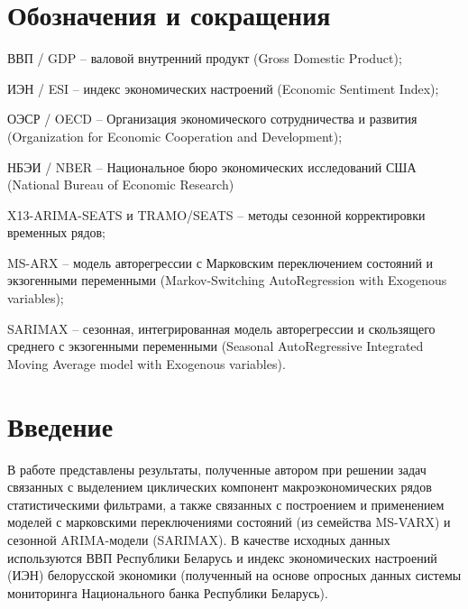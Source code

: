 \documentclass[a4paper,14pt]{extreport}
\begin{document}
	\clearpage
	
	\renewcommand{\contentsname}{Содержание}
	\tableofcontents
	
	\clearpage
	
	
	
	{
		\chapter*{Обозначения и сокращения}
		\nopagebreak %
		
	}

	{ВВП / GDP} -- валовой внутренний продукт (Gross Domestic Product);
	
	{ИЭН / ESI} -- индекс экономических настроений (Economic Sentiment Index);
	
	{ОЭСР / OECD} -- Организация экономического сотрудничества и развития (Organization for Economic Cooperation and Development);
	
	{НБЭИ / NBER} -- Национальное бюро экономических исследований США (National Bureau of Economic Research)
	
	{X13-ARIMA-SEATS} и {TRAMO/SEATS} -- методы сезонной корректировки временных рядов;
	
	{MS-ARX} -- модель авторегрессии с Марковским переключением состояний и экзогенными переменными (Markov-Switching AutoRegression with Exogenous variables);
	
	{SARIMAX} -- сезонная, интегрированная модель авторегрессии и скользящего среднего с экзогенными переменными (Seasonal AutoRegressive Integrated Moving Average model with Exogenous variables).
	
	\clearpage
	
	
	\chapter*{Введение}
	В работе представлены результаты, полученные автором при решении задач связанных с выделением циклических компонент макроэкономических рядов статистическими фильтрами, а также связанных с построением и применением моделей с марковскими переключениями состояний (из семейства MS-VARX) и сезонной ARIMA-модели (SARIMAX).	В качестве исходных данных используются ВВП Республики Беларусь и индекс экономических настроений (ИЭН) белорусской экономики (полученный на основе опросных данных системы мониторинга Национального банка Республики Беларусь). 
		
\end{document}
